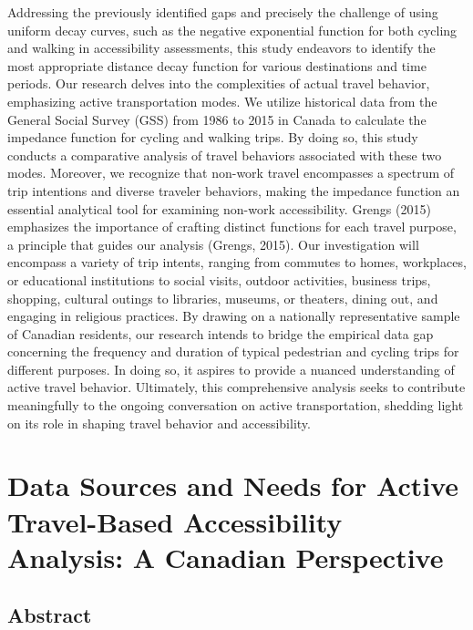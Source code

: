 \documentclass[12pt,twoside]{reedthesis}
\begin{document}
Addressing the previously identified gaps and precisely the challenge of using uniform decay curves, such as the negative exponential function for both cycling and walking in accessibility assessments, this study endeavors to identify the most appropriate distance decay function for various destinations and time periods. Our research delves into the complexities of actual travel behavior, emphasizing active transportation modes. We utilize historical data from the General Social Survey (GSS) from 1986 to 2015 in Canada to calculate the impedance function for cycling and walking trips. By doing so, this study conducts a comparative analysis of travel behaviors associated with these two modes.
Moreover, we recognize that non-work travel encompasses a spectrum of trip intentions and diverse traveler behaviors, making the impedance function an essential analytical tool for examining non-work accessibility. Grengs (2015) emphasizes the importance of crafting distinct functions for each travel purpose, a principle that guides our analysis (Grengs, 2015). Our investigation will encompass a variety of trip intents, ranging from commutes to homes, workplaces, or educational institutions to social visits, outdoor activities, business trips, shopping, cultural outings to libraries, museums, or theaters, dining out, and engaging in religious practices. By drawing on a nationally representative sample of Canadian residents, our research intends to bridge the empirical data gap concerning the frequency and duration of typical pedestrian and cycling trips for different purposes. In doing so, it aspires to provide a nuanced understanding of active travel behavior. Ultimately, this comprehensive analysis seeks to contribute meaningfully to the ongoing conversation on active transportation, shedding light on its role in shaping travel behavior and accessibility.

\hypertarget{rmd-basics}{%
\chapter{Data Sources and Needs for Active Travel-Based Accessibility Analysis: A Canadian Perspective}\label{rmd-basics}}

\hypertarget{abstract}{%
\section{Abstract}\label{abstract}}
\end{document}
